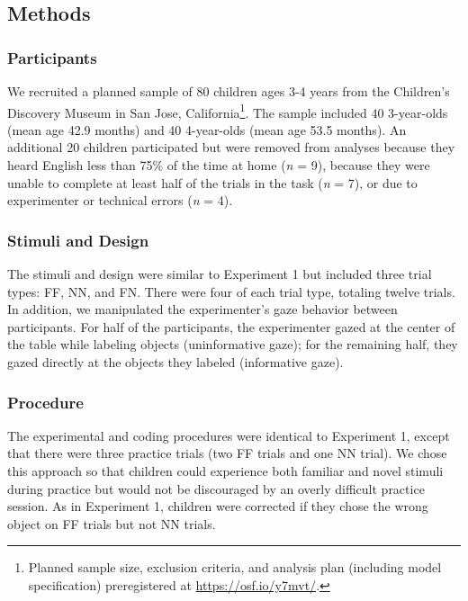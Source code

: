 \documentclass[english,,man]{apa6}
\let\rmarkdownfootnote\footnote%
\def\footnote{\protect\rmarkdownfootnote}
\begin{document}
\subsection{Methods}\label{methods-1}

\subsubsection{Participants}\label{participants-1}

We recruited a planned sample of 80 children ages 3-4 years from the
Children's Discovery Museum in San Jose, California\footnote{Planned
  sample size, exclusion criteria, and analysis plan (including model
  specification) preregistered at \url{https://osf.io/y7mvt/}.}. The
sample included 40 3-year-olds (mean age 42.9 months) and 40 4-year-olds
(mean age 53.5 months). An additional 20 children participated but were
removed from analyses because they heard English less than 75\% of the
time at home (\emph{n} = 9), because they were unable to complete at
least half of the trials in the task (\emph{n} = 7), or due to
experimenter or technical errors (\emph{n} = 4).

\subsubsection{Stimuli and Design}\label{stimuli-and-design-1}

The stimuli and design were similar to Experiment 1 but included three
trial types: FF, NN, and FN. There were four of each trial type,
totaling twelve trials. In addition, we manipulated the experimenter's
gaze behavior between participants. For half of the participants, the
experimenter gazed at the center of the table while labeling objects
(uninformative gaze); for the remaining half, they gazed directly at the
objects they labeled (informative gaze).

\subsubsection{Procedure}\label{procedure-1}

The experimental and coding procedures were identical to Experiment 1,
except that there were three practice trials (two FF trials and one NN
trial). We chose this approach so that children could experience both
familiar and novel stimuli during practice but would not be discouraged
by an overly difficult practice session. As in Experiment 1, children
were corrected if they chose the wrong object on FF trials but not NN
trials.
\end{document}
